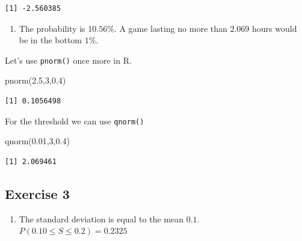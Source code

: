 \documentclass[
  letterpaper,
  DIV=11,
  numbers=noendperiod]{scrreprt}
\newenvironment{Shaded}{\begin{snugshade}}{\end{snugshade}}
\newcommand{\DecValTok}[1]{\textcolor[rgb]{0.68,0.00,0.00}{#1}}
\newcommand{\FloatTok}[1]{\textcolor[rgb]{0.68,0.00,0.00}{#1}}
\newcommand{\FunctionTok}[1]{\textcolor[rgb]{0.28,0.35,0.67}{#1}}
\newcommand{\NormalTok}[1]{\textcolor[rgb]{0.00,0.23,0.31}{#1}}
\providecommand{\tightlist}{%
  \setlength{\itemsep}{0pt}\setlength{\parskip}{0pt}}\usepackage{longtable,booktabs,array}
\begin{document}
\begin{verbatim}
[1] -2.560385
\end{verbatim}

\begin{blackbox}

\begin{enumerate}
\def\labelenumi{\arabic{enumi}.}
\setcounter{enumi}{2}
\tightlist
\item
  The probability is \(10.56\)\%. A game lasting no more than \(2.069\)
  hours would be in the bottom \(1\)\%.
\end{enumerate}

\end{blackbox}

Let's use \texttt{pnorm()} once more in R.

\begin{Shaded}
\begin{Highlighting}[numbers=left,,]
\FunctionTok{pnorm}\NormalTok{(}\FloatTok{2.5}\NormalTok{,}\DecValTok{3}\NormalTok{,}\FloatTok{0.4}\NormalTok{)}
\end{Highlighting}
\end{Shaded}

\begin{verbatim}
[1] 0.1056498
\end{verbatim}

For the threshold we can use \texttt{qnorm()}

\begin{Shaded}
\begin{Highlighting}[numbers=left,,]
\FunctionTok{qnorm}\NormalTok{(}\FloatTok{0.01}\NormalTok{,}\DecValTok{3}\NormalTok{,}\FloatTok{0.4}\NormalTok{)}
\end{Highlighting}
\end{Shaded}

\begin{verbatim}
[1] 2.069461
\end{verbatim}

\hypertarget{exercise-3-19}{%
\subsection*{Exercise 3}\label{exercise-3-19}}

\begin{blackbox}

\begin{enumerate}
\def\labelenumi{\arabic{enumi}.}
\tightlist
\item
  The standard deviation is equal to the mean \(0.1\).
  \(P(0.10 \leq S \leq 0.2)=0.2325\)
\end{enumerate}

\end{blackbox}
\end{document}
